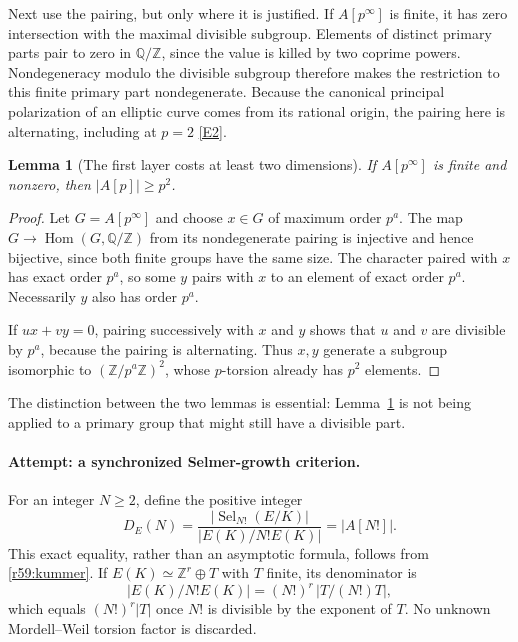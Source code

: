 \documentclass[11pt,a4paper]{article}
\newcommand{\Z}{\mathbb{Z}}
\newcommand{\Q}{\mathbb{Q}}
\newcommand{\eref}[2]{\hyperlink{extra:#1:#2}{[E#2]}}
\newtheorem{notebooklemma}{Lemma}[section]
\numberwithin{equation}{section}
\begin{document}
Next use the pairing, but only where it is justified. If $A[p^\infty]$ is finite, it has zero intersection with the maximal divisible subgroup. Elements of distinct primary parts pair to zero in $\Q/\Z$, since the value is killed by two coprime powers. Nondegeneracy modulo the divisible subgroup therefore makes the restriction to this finite primary part nondegenerate. Because the canonical principal polarization of an elliptic curve comes from its rational origin, the pairing here is alternating, including at $p=2$ \eref{30006701}{2}.

\begin{notebooklemma}[The first layer costs at least two dimensions]\label{r59:two}
If $A[p^\infty]$ is finite and nonzero, then $|A[p]|\geq p^2$.
\end{notebooklemma}
\begin{proof}
Let $G=A[p^\infty]$ and choose $x\in G$ of maximum order $p^a$. The map $G\to\operatorname{Hom}(G,\Q/\Z)$ from its nondegenerate pairing is injective and hence bijective, since both finite groups have the same size. The character paired with $x$ has exact order $p^a$, so some $y$ pairs with $x$ to an element of exact order $p^a$. Necessarily $y$ also has order $p^a$.

If $ux+vy=0$, pairing successively with $x$ and $y$ shows that $u$ and $v$ are divisible by $p^a$, because the pairing is alternating. Thus $x,y$ generate a subgroup isomorphic to $(\Z/p^a\Z)^2$, whose $p$-torsion already has $p^2$ elements.
\end{proof}
The distinction between the two lemmas is essential: Lemma~\ref{r59:two} is not being applied to a primary group that might still have a divisible part.

\paragraph{Attempt: a synchronized Selmer-growth criterion.}
For an integer $N\geq2$, define the positive integer
\begin{equation}\label{r59:defect}
 D_E(N)=\frac{|\operatorname{Sel}_{N!}(E/K)|}
                   {|E(K)/N!E(K)|}=|A[N!]|.
\end{equation}
This exact equality, rather than an asymptotic formula, follows from \eqref{r59:kummer}. If $E(K)\simeq\Z^r\oplus T$ with $T$ finite, its denominator is
\[
 |E(K)/N!E(K)|=(N!)^r\,|T/(N!)T|,
\]
which equals $(N!)^r|T|$ once $N!$ is divisible by the exponent of $T$. No unknown Mordell--Weil torsion factor is discarded.
\end{document}
